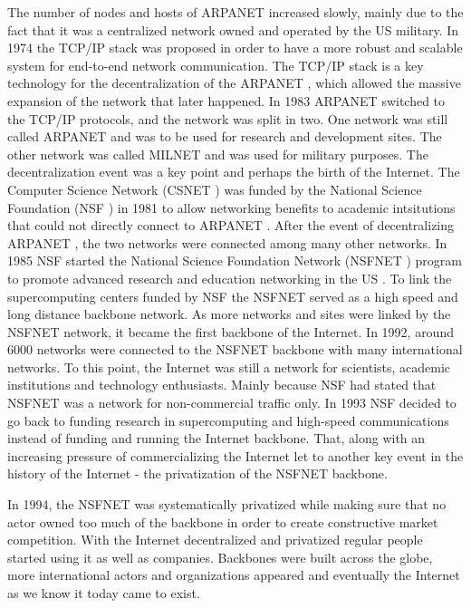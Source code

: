 \documentclass[a4paper,11pt]{kth-mag}
\newcommand\abbr[2][]{\uppercase{#2}\ifthenelse{\equal{#1}{}}%
                     {}{#1}}
\begin{document}
        The number of nodes and hosts of \abbr{arpanet} increased slowly, mainly due to the fact that it was a centralized network owned and operated by the \abbr{us} military.
        In 1974 the \abbr{tcp/ip} stack was proposed in order to have a more robust and scalable system for end-to-end network communication.
        The \abbr{tcp/ip} stack is a key technology for the decentralization of the \abbr{arpanet}, which allowed the massive expansion of the network that later happened.
        In 1983 \abbr{arpanet} switched to the \abbr{tcp/ip} protocols, and the network was split in two.
        One network was still called \abbr{arpanet} and was to be used for research and development sites.
        The other network was called \abbr{milnet} and was used for military purposes.
        The decentralization event was a key point and perhaps the birth of the Internet.
        The Computer Science Network (\abbr{csnet}) was funded by the National Science Foundation (\abbr{nsf}) in 1981 to allow networking benefits to academic intsitutions that could not directly connect to \abbr{arpanet}.
        After the event of decentralizing \abbr{arpanet}, the two networks were connected among many other networks.
        In 1985 \abbr{nsf} started the National Science Foundation Network (\abbr{nsfnet}) program to promote advanced research and education networking in the \abbr{us}.
        To link the supercomputing centers funded by \abbr{nsf} the \abbr{nsfnet} served as a high speed and long distance backbone network.
        As more networks and sites were linked by the \abbr{nsfnet} network, it became the first backbone of the Internet.
        In 1992, around 6000 networks were connected to the \abbr{nsfnet} backbone with many international networks.
        To this point, the Internet was still a network for scientists, academic institutions and technology enthusiasts.
        Mainly because \abbr{nsf} had stated that \abbr{nsfnet} was a network for non-commercial traffic only.
        In 1993 \abbr{nsf} decided to go back to funding research in supercomputing and high-speed communications instead of funding and running the Internet backbone.
        That, along with an increasing pressure of commercializing the Internet let to another key event in the history of the Internet - the privatization of the \abbr{nsfnet} backbone.

        In 1994, the \abbr{nsfnet} was systematically privatized while making sure that no actor owned too much of the backbone in order to create constructive market competition.
        With the Internet decentralized and privatized regular people started using it as well as companies.
        Backbones were built across the globe, more international actors and organizations appeared and eventually the Internet as we know it today came to exist.
\end{document}
